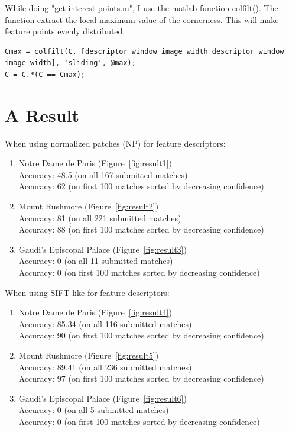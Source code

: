 While doing "get interest points.m", I use the matlab function colfilt(). The function extract the local maximum value of the cornerness. This will make feature points evenly distributed.
\begin{lstlisting}[style=Matlab-editor]
Cmax = colfilt(C, [descriptor window image width descriptor window image width], 'sliding', @max);
C = C.*(C == Cmax);
\end{lstlisting}

\newpage
\section*{A Result}

When using normalized patches (NP) for feature descriptors:
\begin{enumerate}
    \item Notre Dame de Paris (Figure~\ref{fig:result1})\\
    Accuracy:  48.5 (on all 167 submitted matches)\\
    Accuracy:  62 (on first 100 matches sorted by decreasing confidence)
    \item Mount Rushmore (Figure~\ref{fig:result2})\\
    Accuracy:  81 (on all 221 submitted matches)\\
    Accuracy:  88 (on first 100 matches sorted by decreasing confidence)
    \item Gaudi's Episcopal Palace (Figure~\ref{fig:result3})\\
    Accuracy:  0 (on all 11 submitted matches)\\ 
    Accuracy:  0 (on first 100 matches sorted by decreasing confidence)
\end{enumerate}


When using SIFT-like for feature descriptors:
\begin{enumerate}
    \item Notre Dame de Paris (Figure~\ref{fig:result4})\\
    Accuracy:  85.34 (on all 116 submitted matches)\\
    Accuracy:  90 (on first 100 matches sorted by decreasing confidence)
    \item Mount Rushmore (Figure~\ref{fig:result5})\\
    Accuracy:  89.41 (on all 236 submitted matches)\\
    Accuracy:  97 (on first 100 matches sorted by decreasing confidence)
    \item Gaudi's Episcopal Palace (Figure~\ref{fig:result6})\\
    Accuracy:  0 (on all 5 submitted matches)\\ 
    Accuracy:  0 (on first 100 matches sorted by decreasing confidence)
\end{enumerate}


